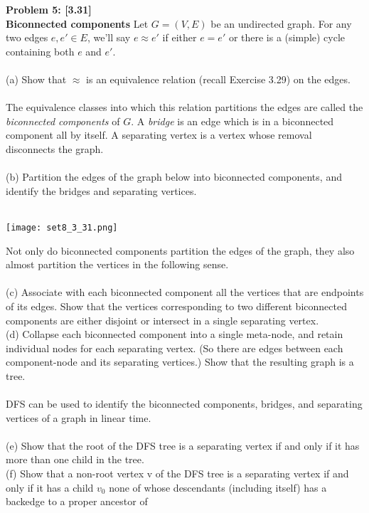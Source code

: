 \documentclass{article}
\begin{document}
{\bf Problem 5: [3.31]}\\
{\bf Biconnected components} Let $G = (V, E)$ be an undirected graph. For any two edges $e, e'\in E$, we'll say $e\approx e'$ if either $e = e'$ or there is a (simple) cycle containing both $e$ and $e'$.\\\\
(a) Show that $\approx$ is an equivalence relation (recall Exercise 3.29) on the edges.\\\\
The equivalence classes into which this relation partitions the edges are called the \textit{biconnected components} of $G$. A \textit{bridge} is an edge which is in a biconnected component all by itself.
A separating vertex is a vertex whose removal disconnects the graph.\\\\
(b) Partition the edges of the graph below into biconnected components, and identify the bridges and separating vertices.\\\\
\begin{center}
	\centering
	\texttt{[image: set8\_3\_31.png]}
\end{center}
Not only do biconnected components partition the edges of the graph, they also almost partition the vertices in the following sense.\\\\
(c) Associate with each biconnected component all the vertices that are endpoints of its edges.
Show that the vertices corresponding to two different biconnected components are either disjoint or intersect in a single separating vertex.\\
(d) Collapse each biconnected component into a single meta-node, and retain individual nodes for each separating vertex. (So there are edges between each component-node and its separating vertices.) 
Show that the resulting graph is a tree.\\\\
DFS can be used to identify the biconnected components, bridges, and separating vertices of a graph in linear time.\\\\
(e) Show that the root of the DFS tree is a separating vertex if and only if it has more than one child in the tree.\\
(f) Show that a non-root vertex v of the DFS tree is a separating vertex if and only if it has a child $v_0$ none of whose descendants (including itself) has a backedge to a proper ancestor of
\end{document}
